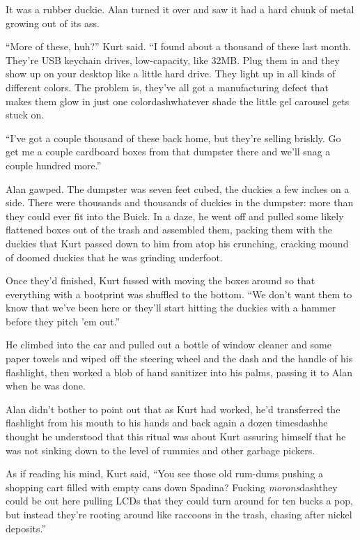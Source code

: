 It was a rubber duckie.  Alan turned it over and saw it had a hard
chunk of metal growing out of its ass.

``More of these, huh?'' Kurt said.  ``I found about a thousand of
these last month.  They're USB keychain drives, low-capacity, like
32MB.  Plug them in and they show up on your desktop like a little
hard drive.  They light up in all kinds of different colors.  The
problem is, they've all got a manufacturing defect that makes them
glow in just one colordash{}whatever shade the little gel carousel gets
stuck on.

``I've got a couple thousand of these back home, but they're selling
briskly.  Go get me a couple cardboard boxes from that dumpster there
and we'll snag a couple hundred more.''

Alan gawped.  The dumpster was seven feet cubed, the duckies a few
inches on a side.  There were thousands and thousands of duckies in
the dumpster:  more than they could ever fit into the Buick.  In a
daze, he went off and pulled some likely flattened boxes out of the
trash and assembled them, packing them with the duckies that Kurt
passed down to him from atop his crunching, cracking mound of doomed
duckies that he was grinding underfoot.

Once they'd finished, Kurt fussed with moving the boxes around so that
everything with a bootprint was shuffled to the bottom.  ``We don't
want them to know that we've been here or they'll start hitting the
duckies with a hammer before they pitch 'em out.''

He climbed into the car and pulled out a bottle of window cleaner and
some paper towels and wiped off the steering wheel and the dash and
the handle of his flashlight, then worked a blob of hand sanitizer
into his palms, passing it to Alan when he was done.

Alan didn't bother to point out that as Kurt had worked, he'd
transferred the flashlight from his mouth to his hands and back again
a dozen timesdash{}he thought he understood that this ritual was about
Kurt assuring himself that he was not sinking down to the level of
rummies and other garbage pickers.

As if reading his mind, Kurt said, ``You see those old rum-dums
pushing a shopping cart filled with empty cans down Spadina?  Fucking
\textit{morons}dash{}they could be out here pulling LCDs that they could
turn around for ten bucks a pop, but instead they're rooting around
like raccoons in the trash, chasing after nickel deposits.''

